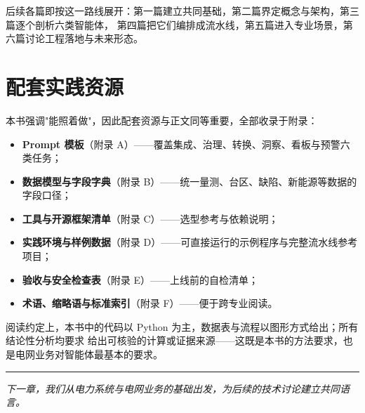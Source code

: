 \documentclass[UTF8,a4paper,12pt]{ctexart}
\begin{document}
后续各篇即按这一路线展开：第一篇建立共同基础，第二篇界定概念与架构，第三篇逐个剖析六类智能体，
第四篇把它们编排成流水线，第五篇进入专业场景，第六篇讨论工程落地与未来形态。

\section{配套实践资源}

本书强调"能照着做"，因此配套资源与正文同等重要，全部收录于附录：

\begin{itemize}[leftmargin=2em,itemsep=2pt]
  \item \textbf{Prompt 模板}（附录 A）——覆盖集成、治理、转换、洞察、看板与预警六类任务；
  \item \textbf{数据模型与字段字典}（附录 B）——统一量测、台区、缺陷、新能源等数据的字段口径；
  \item \textbf{工具与开源框架清单}（附录 C）——选型参考与依赖说明；
  \item \textbf{实践环境与样例数据}（附录 D）——可直接运行的示例程序与完整流水线参考项目；
  \item \textbf{验收与安全检查表}（附录 E）——上线前的自检清单；
  \item \textbf{术语、缩略语与标准索引}（附录 F）——便于跨专业阅读。
\end{itemize}

阅读约定上，本书中的代码以 Python 为主，数据表与流程以图形方式给出；所有结论性分析均要求
给出可核验的计算或证据来源——这既是本书的方法要求，也是电网业务对智能体最基本的要求。

\vspace{1.2em}
\hrule
\vspace{0.6em}
\begin{center}
\small\itshape\color{primary}
下一章，我们从电力系统与电网业务的基础出发，为后续的技术讨论建立共同语言。
\end{center}
\end{document}
